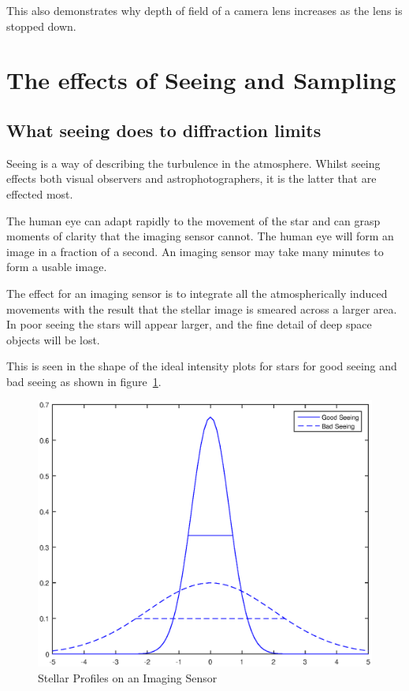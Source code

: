 \documentclass[11pt]{article}
\begin{document}
This also demonstrates why depth of field of a camera lens increases as the lens is stopped down.

\newpage
\section{The effects of Seeing and Sampling}

\subsection{What seeing does to diffraction limits}
Seeing is a way of describing the turbulence in the atmosphere.  Whilst seeing effects both visual observers and astrophotographers, it is the latter that are effected most.  

The human eye can adapt rapidly to the movement of the star and can grasp moments of clarity that the imaging sensor cannot.  The human eye will form an image in a fraction of a second. An imaging sensor may take many minutes to form a usable image.

The effect for an imaging sensor is to integrate all the atmospherically induced movements with the result that the stellar image is smeared across a larger area.  In poor seeing the stars will appear larger, and the fine detail of deep space objects will be lost.


This is seen in the shape of the ideal intensity plots for stars for good seeing and bad seeing as shown in figure~\ref{fig:stellar-profiles}.

\begin{figure}[htb]
	\begin{center}
		\includegraphics[scale=0.7]{./images/stellar-profiles.eps}
		\caption{Stellar Profiles on an Imaging Sensor}
		\label{fig:stellar-profiles}
	\end{center}
\end{figure}
\end{document}
